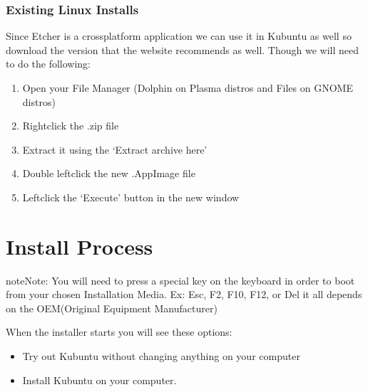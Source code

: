 \documentclass[letterpaper,10pt,english]{sphinxmanual}
\begin{document}
\subsubsection{Existing Linux Installs}
\label{\detokenize{docs/installation:existing-linux-installs}}\label{\detokenize{docs/installation:kubuntu-install-link}}\label{\detokenize{docs/installation:usb-drives-link}}
\sphinxAtStartPar
Since Etcher is a cross\sphinxhyphen{}platform application we can use it in Kubuntu as well so download the version that the  website recommends as well.
Though we will need to do the following:
\begin{enumerate}
%
\item {} 
\sphinxAtStartPar
Open your File Manager (Dolphin on Plasma distros and Files on GNOME distros)

\item {} 
\sphinxAtStartPar
Right\sphinxhyphen{}click the .zip file

\item {} 
\sphinxAtStartPar
Extract it using the ‘Extract archive here’

\item {} 
\sphinxAtStartPar
Double left\sphinxhyphen{}click the new .AppImage file

\item {} 
\sphinxAtStartPar
Left\sphinxhyphen{}click the ‘Execute’ button in the new window

\end{enumerate}


\section{Install Process}
\label{\detokenize{docs/installation:install-process}}
\begin{sphinxadmonition}{note}{Note:}
\sphinxAtStartPar
You will need to press a special key on the keyboard in order to boot from your chosen Installation Media. Ex: Esc, F2, F10, F12, or Del it all depends on the OEM(Original Equipment Manufacturer)
\end{sphinxadmonition}


\sphinxAtStartPar
When the installer starts you will see these options:
\begin{itemize}
\item {} 
\sphinxAtStartPar
Try out Kubuntu without changing anything on your computer

\item {} 
\sphinxAtStartPar
Install Kubuntu on your computer.

\end{itemize}
\end{document}
